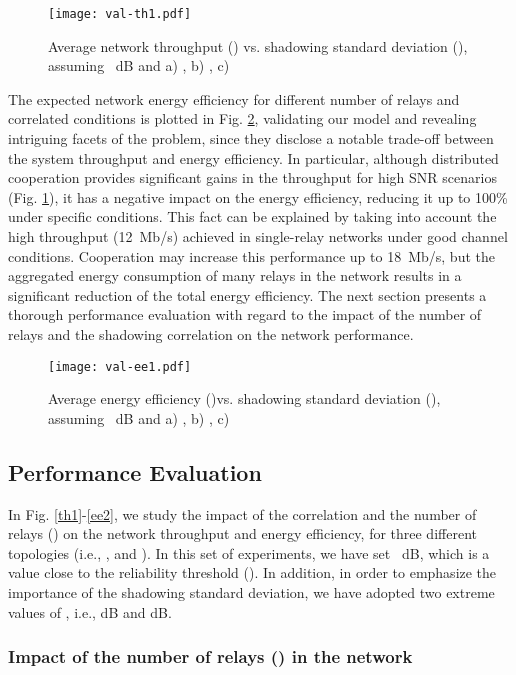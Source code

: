 \documentclass[12pt,draftcls, onecolumn]{IEEEtran}
\begin{document}
\begin{figure}[htb]
\centering
\texttt{[image: val-th1.pdf]}
\caption{Average network throughput () vs. shadowing standard deviation (), assuming ~dB and a) , b) , c) } \label{val1}
\end{figure}

The expected network energy efficiency for different number of relays and correlated conditions is plotted in Fig. \ref{val2}, validating our model and revealing intriguing facets of the problem, since they disclose a notable trade-off between the system throughput and energy efficiency. In particular, although distributed cooperation provides significant gains in the throughput for high SNR scenarios (Fig. \ref{val1}), it has a negative impact on the energy efficiency, reducing it up to 100\% under specific conditions. This fact can be explained by taking into account the high throughput (12~Mb/s) achieved in single-relay networks under good channel conditions. Cooperation may increase this performance up to 18~Mb/s, but the aggregated energy consumption of many relays in the network results in a significant reduction of the total energy efficiency. The next section presents a thorough performance evaluation with regard to the impact of the number of relays and the shadowing correlation on the network performance.

\begin{figure}[htb]
\centering
\texttt{[image: val-ee1.pdf]}
\caption{Average energy efficiency ()vs. shadowing standard deviation (), assuming ~dB and a) , b) , c) } \label{val2}
\end{figure}

\subsection{Performance Evaluation}

In Fig. \ref{th1}-\ref{ee2}, we study the impact of the correlation and the number of relays () on the network throughput and energy efficiency, for three different topologies (i.e., ,  and ). In this set of experiments, we have set ~dB, which is a value close to the reliability threshold (). In addition, in order to emphasize the importance of the shadowing standard deviation, we have adopted two extreme values of , i.e.,  dB and  dB.

\subsubsection{Impact of the number of relays () in the network}
\end{document}
